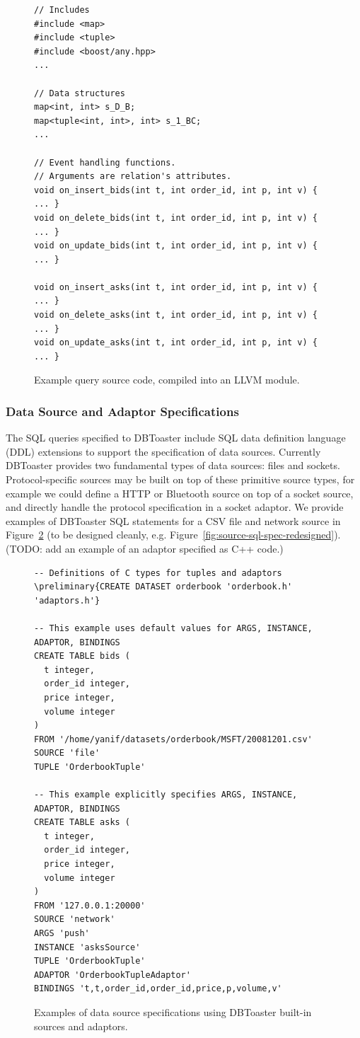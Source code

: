 \documentclass[14pt]{article}
\newcommand{\preliminary}[1]{\textcolor{prelim}{#1}}
\begin{document}
\begin{figure}[h]
\begin{Verbatim}
// Includes
#include <map>
#include <tuple>
#include <boost/any.hpp>
...

// Data structures
map<int, int> s_D_B;
map<tuple<int, int>, int> s_1_BC;
...

// Event handling functions.
// Arguments are relation's attributes.
void on_insert_bids(int t, int order_id, int p, int v) { ... }
void on_delete_bids(int t, int order_id, int p, int v) { ... }
void on_update_bids(int t, int order_id, int p, int v) { ... }

void on_insert_asks(int t, int order_id, int p, int v) { ... }
void on_delete_asks(int t, int order_id, int p, int v) { ... }
void on_update_asks(int t, int order_id, int p, int v) { ... }
\end{Verbatim}
\caption{Example query source code, compiled into an LLVM module.}
\label{fig:example-query-source}
\end{figure}

\subsubsection{Data Source and Adaptor Specifications}
The SQL queries specified to DBToaster include SQL data definition language
(DDL) extensions to support the specification of data sources. Currently
DBToaster provides two fundamental types of data sources: files and
sockets. Protocol-specific sources may be built on top of these primitive source
types, for example we could define a HTTP or Bluetooth source on top of a socket
source, and directly handle the protocol specification in a socket
adaptor.
\preliminary{We provide examples of DBToaster SQL statements for a CSV file and
network source in Figure~\ref{fig:source-sql-spec} (to be designed cleanly,
e.g. Figure~\ref{fig:source-sql-spec-redesigned}).}
\preliminary{(TODO: add an example of an adaptor specified as C++ code.)}

\begin{figure}[htbp]
\begin{Verbatim}[commandchars=\\\{\}]
-- Definitions of C types for tuples and adaptors
\preliminary{CREATE DATASET orderbook 'orderbook.h' 'adaptors.h'}

-- This example uses default values for ARGS, INSTANCE, ADAPTOR, BINDINGS
CREATE TABLE bids (
  t integer,
  order_id integer,
  price integer,
  volume integer
)
FROM '/home/yanif/datasets/orderbook/MSFT/20081201.csv'
SOURCE 'file'
TUPLE 'OrderbookTuple'

-- This example explicitly specifies ARGS, INSTANCE, ADAPTOR, BINDINGS
CREATE TABLE asks (
  t integer,
  order_id integer,
  price integer,
  volume integer
)
FROM '127.0.0.1:20000'
SOURCE 'network'
ARGS 'push'
INSTANCE 'asksSource'
TUPLE 'OrderbookTuple'
ADAPTOR 'OrderbookTupleAdaptor'
BINDINGS 't,t,order_id,order_id,price,p,volume,v'
\end{Verbatim}
\caption{Examples of data source specifications using DBToaster built-in sources and adaptors.}
\label{fig:source-sql-spec}
\end{figure}
\end{document}
